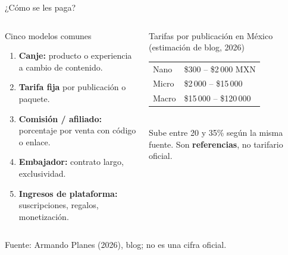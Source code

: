 \documentclass[aspectratio=169,xcolor=dvipsnames]{beamer}
\newcommand{\fuente}[1]{{\tiny\color{IPNgris}Fuente: #1}}
\begin{document}
\begin{frame}{¿Cómo se les paga?}
\begin{columns}[T]
  \begin{block}{Cinco modelos comunes}
    \small
    \begin{enumerate}
      \item \textbf{Canje:} producto o experiencia a cambio de contenido.
      \item \textbf{Tarifa fija} por publicación o paquete.
      \item \textbf{Comisión / afiliado:} porcentaje por venta con código o enlace.
      \item \textbf{Embajador:} contrato largo, exclusividad.
      \item \textbf{Ingresos de plataforma:} suscripciones, regalos, monetización.
    \end{enumerate}
  \end{block}
  \begin{exampleblock}{Tarifas por publicación en México (estimación de blog, 2026)}
    \small
    \begin{tabular}{@{}ll@{}}
      Nano  & \$300 – \$2\,000 MXN\\
      Micro & \$2\,000 – \$15\,000\\
      Macro & \$15\,000 – \$120\,000\\
    \end{tabular}\\[3pt]
    \scriptsize Sube entre 20 y 35\% según la misma fuente. Son \textbf{referencias}, no tarifario oficial.
  \end{exampleblock}
\end{columns}
\fuente{Armando Planes (2026), blog; no es una cifra oficial.}
\end{frame}
\end{document}
